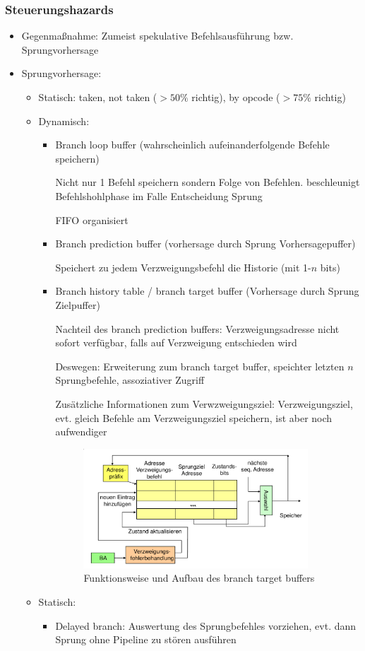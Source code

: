 \subsubsection{Steuerungshazards}
\begin{itemize}
	\item
		Gegenmaßnahme: Zumeist spekulative Befehlsausführung bzw. Sprungvorhersage
	\item
		Sprungvorhersage:
		\begin{itemize}
			\item
				Statisch: taken, not taken ($>50\%$ richtig), by opcode ($>75\%$ richtig)
			\item
				Dynamisch:
				\begin{itemize}
					\item
						Branch loop buffer (wahrscheinlich aufeinanderfolgende Befehle speichern)

						Nicht nur 1 Befehl speichern sondern Folge von Befehlen. beschleunigt Befehlshohlphase im Falle Entscheidung Sprung

						FIFO organisiert
					\item
						Branch prediction buffer (vorhersage durch Sprung Vorhersagepuffer)

						Speichert zu jedem Verzweigungsbefehl die Historie (mit 1-$n$ bits)
					\item
						Branch history table / branch target buffer (Vorhersage durch Sprung Zielpuffer)
						
						Nachteil des branch prediction buffers: Verzweigungsadresse nicht sofort verfügbar, falls auf Verzweigung entschieden wird

						Deswegen: Erweiterung zum branch target buffer, speichter letzten $n$ Sprungbefehle, assoziativer Zugriff

						Zusätzliche Informationen zum Verwzweigungsziel: Verzweigungsziel, evt. gleich Befehle am Verzweigungsziel speichern, ist aber noch aufwendiger
						\begin{figure}[hpbt]
							\centering
							\includegraphics[width=0.9\textwidth]{img/branchtargetbuffer.png}
							\caption{Funktionsweise und Aufbau des branch target buffers}
							\label{fig:btb}
						\end{figure}
				\end{itemize}
			\item
				Statisch:
				\begin{itemize}
					\item
						Delayed branch: Auswertung des Sprungbefehles vorziehen, evt. dann Sprung ohne Pipeline zu stören ausführen


\end{itemize}
\end{itemize}
\end{itemize}
